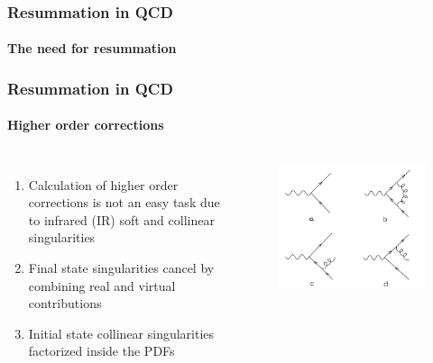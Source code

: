 \documentclass[aspectratio=43]{beamer}
\begin{document}
%
%

\begin{frame}


\end{frame}

\begin{frame}
	
	\frametitle{Resummation in QCD}
	\framesubtitle{The need for resummation}

\end{frame}

\begin{frame}

	\frametitle{Resummation in QCD}
	\framesubtitle{Higher order corrections}
	\begin{columns}
	
	
	\begin{enumerate}
		\item Calculation of higher order corrections is {\color{red}not an easy task} due to {\color{red} infrared (IR) soft and collinear singularities}
		\item Final state singularities {\color{blue}cancel} by combining real and virtual contributions
		\item Initial state collinear singularities {\color{blue}factorized} inside the PDFs
	\end{enumerate}
	
	\begin{figure}[!htb]
		\includegraphics[width = \linewidth]{plots/part2/qcd_corrections.png}
	\end{figure}
	
	\end{columns}

\end{frame}
\end{document}
